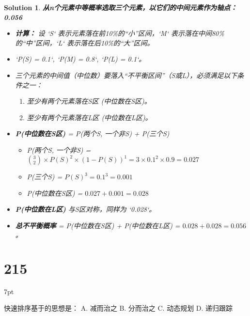 \documentclass[UTF8]{report}
\newtheorem{solution}{Solution}
\theoremstyle{MyLineTheoremStyle} %
\theoremstyle{MyBlockTheoremStyle} %
\theoremstyle{MySubsubsectionStyle} %
\newenvironment{graybox}{%
        \def\FrameCommand{%
        \hspace{1pt}%
        {\color{gray}\small \vrule width 2pt}%
        {\color{graybox_color}\vrule width 4pt}%
        \colorbox{graybox_color}%
        }%
        \MakeFramed{\advance\hsize-\width\FrameRestore}%
        \noindent\hspace{-4.55pt}%
        \begin{adjustwidth}{}{7pt}%
        \vspace{2pt}\vspace{2pt}%
        }
        {%
        \vspace{2pt}\end{adjustwidth}\endMakeFramed%
        }
\begin{document}
\begin{solution}
\textbf{从n个元素中等概率选取三个元素，以它们的中间元素作为轴点：} \textbf{0.056}
\begin{itemize}
    \item \textbf{计算：} 设 `S` 表示元素落在前10\%的“小”区间，`M` 表示落在中间80\%的“中”区间，`L` 表示落在后10\%的“大”区间。
    \item `P(S) = 0.1`, `P(M) = 0.8`, `P(L) = 0.1`。
    \item 三个元素的中间值（中位数）要落入“不平衡区间”（S或L），必须满足以下条件之一：
    \begin{enumerate}
        \item 至少有两个元素落在S区 (中位数在S区)。
        \item 至少有两个元素落在L区 (中位数在L区)。
    \end{enumerate}
    \item \textbf{P(中位数在S区)} = P(两个S, 一个非S) + P(三个S)
    \begin{itemize}
        \item P(两个S, 一个非S) = $\binom{3}{2} \times P(S)^2 \times (1-P(S))^1 = 3 \times 0.1^2 \times 0.9 = 0.027$
        \item P(三个S) = $P(S)^3 = 0.1^3 = 0.001$
        \item P(中位数在S区) = $0.027 + 0.001 = 0.028$
    \end{itemize}
    \item \textbf{P(中位数在L区)} 与S区对称，同样为 `0.028`。
    \item \textbf{总不平衡概率} = P(中位数在S区) + P(中位数在L区) = $0.028 + 0.028 = 0.056$。
\end{itemize}
\end{solution}

\section*{215}
\begin{graybox}
快速排序基于的思想是：
A. 减而治之
B. 分而治之
C. 动态规划
D. 递归跟踪
\end{graybox}
\end{document}
